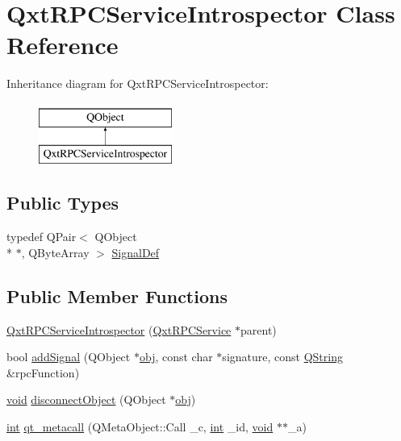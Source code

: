 \hypertarget{class_qxt_r_p_c_service_introspector}{\section{Qxt\-R\-P\-C\-Service\-Introspector Class Reference}
\label{class_qxt_r_p_c_service_introspector}
}
Inheritance diagram for Qxt\-R\-P\-C\-Service\-Introspector\-:\begin{figure}[H]
\begin{center}
\leavevmode
\includegraphics[height=2.000000cm]{class_qxt_r_p_c_service_introspector}
\end{center}
\end{figure}
\subsection*{Public Types}
\begin{DoxyCompactItemize}
\item 
typedef Q\-Pair$<$ Q\-Object \\*
$\ast$, Q\-Byte\-Array $>$ \hyperlink{class_qxt_r_p_c_service_introspector_a78474ec58d5bb0a8cc0b284d60f7548a}{Signal\-Def}
\end{DoxyCompactItemize}
\subsection*{Public Member Functions}
\begin{DoxyCompactItemize}
\item 
\hyperlink{class_qxt_r_p_c_service_introspector_a5f444b01197f91735501d354082e7efb}{Qxt\-R\-P\-C\-Service\-Introspector} (\hyperlink{class_qxt_r_p_c_service}{Qxt\-R\-P\-C\-Service} $\ast$parent)
\item 
bool \hyperlink{class_qxt_r_p_c_service_introspector_a8989ad722954d822dcd81c4eff3aec92}{add\-Signal} (Q\-Object $\ast$\hyperlink{glext_8h_a0c0d4701a6c89f4f7f0640715d27ab26}{obj}, const char $\ast$signature, const \hyperlink{group___u_a_v_objects_plugin_gab9d252f49c333c94a72f97ce3105a32d}{Q\-String} \&rpc\-Function)
\item 
\hyperlink{group___u_a_v_objects_plugin_ga444cf2ff3f0ecbe028adce838d373f5c}{void} \hyperlink{class_qxt_r_p_c_service_introspector_a6b163b7a1056a715c5d8d680655a43cc}{disconnect\-Object} (Q\-Object $\ast$\hyperlink{glext_8h_a0c0d4701a6c89f4f7f0640715d27ab26}{obj})
\item 
\hyperlink{ioapi_8h_a787fa3cf048117ba7123753c1e74fcd6}{int} \hyperlink{class_qxt_r_p_c_service_introspector_a0477e56c0087bf0ae5df59439b979795}{qt\-\_\-metacall} (Q\-Meta\-Object\-::\-Call \-\_\-c, \hyperlink{ioapi_8h_a787fa3cf048117ba7123753c1e74fcd6}{int} \-\_\-id, \hyperlink{group___u_a_v_objects_plugin_ga444cf2ff3f0ecbe028adce838d373f5c}{void} $\ast$$\ast$\-\_\-a)
\end{DoxyCompactItemize}
